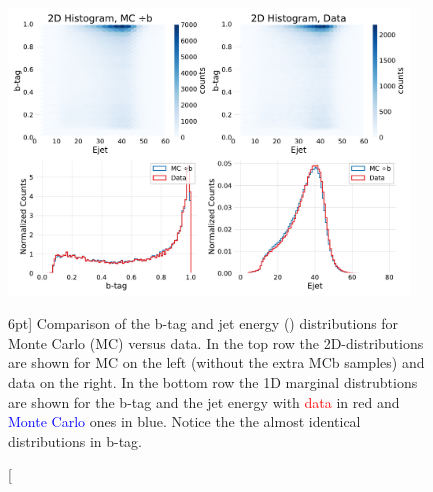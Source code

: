 \documentclass[a4paper, twoside, nobib]{tufte-book}
\newcommand{\code}[1]{\colorbox{light-gray}{\texttt{\detokenize{#1}}}}
\begin{document}
\begin{figure}
  \includegraphics[width=0.95\textwidth, trim=0 0 0 40, clip]{figures/quarks/2d-histograms-ejet-btag-comparison-down_sample=1.00-ML_vars=vertex-selection=b-ejet_min=4-n_iter_RS_lgb=99-n_iter_RS_xgb=9-cdot_cut=0.90-version=19-njet=3.pdf}
  \caption[Monte Carlo -- Data bias for b-tags and jet energy][6pt]
          {Comparison of the b-tag and jet energy (\code{Ejet}) distributions for Monte Carlo (MC) versus data. In the top row the 2D-distributions are shown for MC on the left (without the extra MCb samples) and data on the right. In the bottom row the 1D marginal distrubtions are shown for the b-tag and the jet energy with \textcolor{red}{data} in red and \textcolor{blue}{Monte Carlo} ones in blue. Notice the the almost identical distributions in b-tag. 
          } 
  \label{fig:q:btag_Ejet_comparison}
\end{figure}
\end{document}
